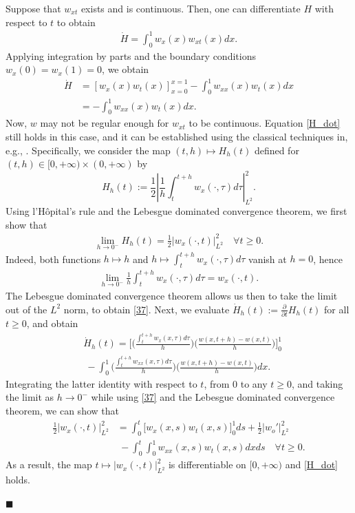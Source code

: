\documentclass[twocolumn]{autart}
\newenvironment{proof}{{\it Proof. }}{\hfill $\blacksquare$ }
\begin{document}
\begin{proof}
Suppose that $w_{xt}$ exists and is continuous. Then, one can differentiate $H$ with respect to $t$ to obtain 
\begin{align*}
\dot{H} = \int_{0}^{1}w_x(x)w_{xt}(x)dx. 
\end{align*}
Applying integration by parts and the boundary conditions $w_x(0)=w_x(1)=0$, we obtain 
\begin{align}
\dot{H} &= \left[w_x(x)w_t(x)\right]_{x=0}^{x=1}-\int_{0}^{1}w_{xx}(x)w_t(x)dx \nonumber \\
&= -\int_{0}^{1}w_{xx}(x)w_t(x)dx. \label{H_dot}
\end{align}
Now, $w$ may not be regular enough for $w_{xt}$ to be continuous. Equation \eqref{H_dot} still holds in this case, and it can be established using the classical techniques in, e.g., \cite{ladyzen}. Specifically, we consider the map $(t,h)\mapsto H_h(t)$ defined for $(t,h)\in [0,+\infty)\times (0,+\infty)$ by
$$ H_h(t) := \frac{1}{2}\left|\frac{1}{h}\int_{t}^{t+h}w_x(\cdot,\tau)d\tau \right|_{L^2}^2. $$ 
Using l'Hôpital's rule and the Lebesgue dominated convergence theorem, we first show that 
\begin{align}
\lim_{h\to 0^-} H_h(t) = \frac{1}{2}|w_x(\cdot,t)|_{L^2}^2 \quad \forall t\geq 0. \label{37}
\end{align}
Indeed, both functions $h\mapsto h$ and $h\mapsto \int_t^{t+h}w_x(\cdot,\tau)d\tau$ vanish at $h=0$, hence 
\begin{align*}
\lim_{h\to 0^-}\frac{1}{h}\int_t^{t+h}w_x(\cdot,\tau)d\tau = w_x(\cdot,t).
\end{align*}
The Lebesgue dominated convergence theorem allows us then to take the limit out of the $L^2$ norm, to obtain \eqref{37}. Next, we evaluate $\dot{H}_h(t) := \frac{\partial }{\partial t}H_h(t)$ for all $t\geq 0$, and obtain
\begin{align}
&\dot{H}_h(t) = \bigg[\bigg(\frac{\int_{t}^{t+h}w_x(x,\tau)d\tau}{h}\bigg) \bigg(\frac{w(x,t+h)-w(x,t)}{h}\bigg)\bigg]_{0}^{1} \nonumber \\
&~- \int_{0}^{1}\bigg(\frac{\int_{t}^{t+h}w_{xx}(x,\tau)d\tau}{h}\bigg) \bigg(\frac{w(x,t+h)-w(x,t)}{h}\bigg)dx. \nonumber
\end{align}
Integrating the latter identity with respect to $t$, from $0$ to any $t\geq 0$, and taking the limit as $h\to 0^-$ while using \eqref{37} and the Lebesgue dominated convergence theorem, we can show that
\begin{align}
\frac{1}{2}|w_x(\cdot,t)|_{L^2}^2 & = \int_{0}^{t}\big[w_x(x,s) w_t(x,s)\big]_{0}^{1}ds +\frac{1}{2}|w_o'|_{L^2}^2 \nonumber \\
&~- \int_{0}^{t}\int_{0}^{1}w_{xx}(x,s)w_t(x,s)dxds \quad \forall t\geq 0. \nonumber 
\end{align}
As a result, the map 
$t\mapsto |w_x(\cdot,t)|_{L^2}^2$ is differentiable on $[0,+\infty)$ and \eqref{H_dot} holds.


\end{proof}
\end{document}
